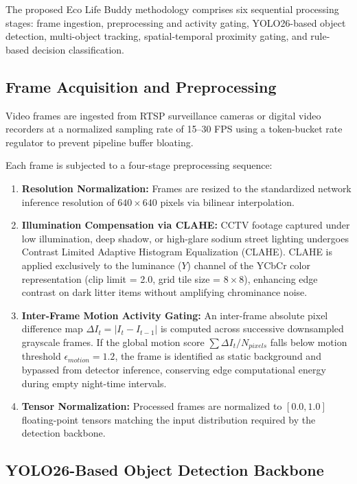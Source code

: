 \documentclass[conference]{IEEEtran}
\begin{document}
The proposed Eco Life Buddy methodology comprises six sequential processing stages: frame ingestion, preprocessing and activity gating, YOLO26-based object detection, multi-object tracking, spatial-temporal proximity gating, and rule-based decision classification.

\subsection{Frame Acquisition and Preprocessing}

Video frames are ingested from RTSP surveillance cameras or digital video recorders at a normalized sampling rate of 15--30 FPS using a token-bucket rate regulator to prevent pipeline buffer bloating.

Each frame is subjected to a four-stage preprocessing sequence:
\begin{enumerate}
\item \textbf{Resolution Normalization:} Frames are resized to the standardized network inference resolution of $640 \times 640$ pixels via bilinear interpolation.
\item \textbf{Illumination Compensation via CLAHE:} CCTV footage captured under low illumination, deep shadow, or high-glare sodium street lighting undergoes Contrast Limited Adaptive Histogram Equalization (CLAHE). CLAHE is applied exclusively to the luminance ($Y$) channel of the YCbCr color representation (clip limit = 2.0, grid tile size = $8 \times 8$), enhancing edge contrast on dark litter items without amplifying chrominance noise.
\item \textbf{Inter-Frame Motion Activity Gating:} An inter-frame absolute pixel difference map $\Delta I_t = |I_t - I_{t-1}|$ is computed across successive downsampled grayscale frames. If the global motion score $\sum \Delta I_t / N_{pixels}$ falls below motion threshold $\epsilon_{motion} = 1.2$, the frame is identified as static background and bypassed from detector inference, conserving edge computational energy during empty night-time intervals.
\item \textbf{Tensor Normalization:} Processed frames are normalized to $[0.0, 1.0]$ floating-point tensors matching the input distribution required by the detection backbone.
\end{enumerate}

\subsection{YOLO26-Based Object Detection Backbone}
\end{document}
